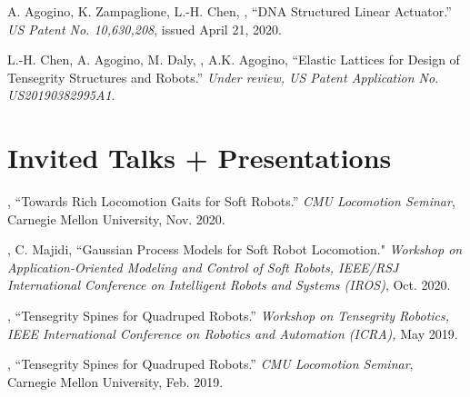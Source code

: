 \documentclass[letterpaper]{deedy-resume} %
\begin{document}
{\vspace{0.1cm}

\begin{etaremune}[itemsep=0.1cm]

\item A. Agogino, K. Zampaglione, L.-H. Chen, \underline{{}}, ``DNA Structured Linear Actuator.'' {\it US Patent No. 10,630,208}, issued April 21, 2020.

\item L.-H. Chen, A. Agogino, M. Daly, \underline{{}}, A.K. Agogino, ``Elastic Lattices for Design of Tensegrity Structures and Robots.'' {\it Under review, US Patent Application No. US20190382995A1}.

\end{etaremune}


 \section{Invited Talks + Presentations}

 \vspace{0.1cm}


 \begin{etaremune}[itemsep=0.1cm]

\item \underline{{}}, ``Towards Rich Locomotion Gaits for Soft Robots.'' {\it CMU Locomotion Seminar}, Carnegie Mellon University, Nov. 2020.

\item \underline{{}}, C. Majidi, ``Gaussian Process Models for Soft Robot Locomotion." {\it Workshop on Application-Oriented Modeling and Control of Soft Robots, IEEE/RSJ International Conference on Intelligent Robots and Systems (IROS)}, Oct. 2020.

\item \underline{{}}, ``Tensegrity Spines for Quadruped Robots.'' {\it Workshop on Tensegrity Robotics, IEEE International Conference on Robotics and Automation (ICRA),} May 2019.

\item \underline{{}}, ``Tensegrity Spines for Quadruped Robots.'' {\it CMU Locomotion Seminar}, Carnegie Mellon University, Feb. 2019.


\end{etaremune}}
\end{document}
